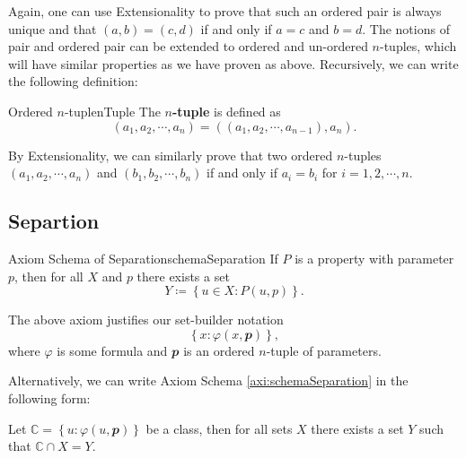 \documentclass[math]{amznotes}
\theoremstyle{remark}
\begin{document}
Again, one can use Extensionality to prove that such an ordered pair is always unique and that $(a, b) = (c, d)$ if and only if $a = c$ and $b = d$. The notions of pair and ordered pair can be extended to ordered and un-ordered $n$-tuples, which will have similar properties as we have proven as above. Recursively, we can write the following definition:
\begin{dfnbox}{Ordered $n$-tuple}{nTuple}
    The {\color{red} \textbf{$n$-tuple}} is defined as 
    \begin{displaymath}
        (a_1, a_2, \cdots, a_n) = ((a_1, a_2, \cdots, a_{n - 1}), a_n).
    \end{displaymath}
\end{dfnbox}
By Extensionality, we can similarly prove that two ordered $n$-tuples $(a_1, a_2, \cdots, a_n)$ and $(b_1, b_2, \cdots, b_n)$ if and only if $a_i = b_i$ for $i = 1, 2, \cdots, n$.
\subsection{Separtion}
\begin{axibox}{Axiom Schema of Separation}{schemaSeparation}
    If $P$ is a property with parameter $p$, then for all $X$ and $p$ there exists a set 
    \begin{displaymath}
        Y \coloneqq \left\{u \in X \colon P(u, p)\right\}.
    \end{displaymath}
\end{axibox}
The above axiom justifies our set-builder notation
\begin{displaymath}
    \left\{x \colon \varphi(x, \mathbfit{p})\right\},
\end{displaymath}
where $\varphi$ is some formula and $\mathbfit{p}$ is an ordered $n$-tuple of parameters.

Alternatively, we can write Axiom Schema \ref{axi:schemaSeparation} in the following form:

    Let $\mathbb{C} = \left\{u \colon \varphi(u, \mathbfit{p})\right\}$ be a class, then for all sets $X$ there exists a set $Y$ such that $\mathbb{C} \cap X = Y$.
\end{document}
